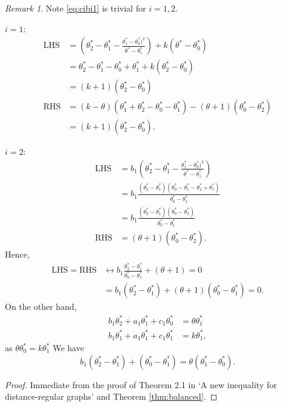 \documentclass[
]{book}
\theoremstyle{definition}
\theoremstyle{definition}
\theoremstyle{definition}
\theoremstyle{definition}
\theoremstyle{remark}
\newtheorem*{remark}{Remark}
\begin{document}
\begin{remark}
Note \eqref{eq:cibi1} is trivial for \(i = 1, 2\).

\(i=1\):
\begin{align}
\mathrm{LHS} & = \left(\theta^*_2-\theta^*_1 - \frac{\theta^*_1-\theta^*_0)^2}{\theta^*-\theta^*_1}\right)+ k(\theta^*-\theta^*_0)\\
& = \theta^*_2-\theta^*_1 - \theta^*_0 + \theta^*_1 + k(\theta_2^*-\theta^*_0)\\
& = (k+1)(\theta^*_2-\theta^*_0)\\
\mathrm{RHS} & = (k-\theta)(\theta^*_1+\theta^*_2-\theta^*_0-\theta^*_1)-(\theta+1)(\theta^*_0-\theta^*_2)\\
& = (k+1)(\theta^*_2-\theta^*_0).
\end{align}

\(i=2\):
\begin{align}
\mathrm{LHS} & = b_1\left(\theta^*_2-\theta^*_1 - \frac{\theta^*_1-\theta^*_0)^2}{\theta^*-\theta^*_1}\right)\\
& = b_1\frac{(\theta^*_2-\theta^*_1)(\theta^*_0-\theta^*_1-\theta^*_2+\theta^*_1)}{\theta^*_0-\theta^*_1}\\
& = b_1\frac{(\theta^*_2-\theta^*_1)(\theta^*_0-\theta^*_2)}{\theta^*_0-\theta^*_1}\\
\mathrm{RHS} & = (\theta+1)(\theta^*_0-\theta^*_2).
\end{align}
Hence,
\begin{align}
\mathrm{LHS}=\mathrm{RHS} & \leftrightarrow b_1\frac{\theta^*_2-\theta^*_1}{\theta^*_0-\theta^*_1} + (\theta + 1) = 0\\
& = b_1(\theta^*_2-\theta^*_1)+(\theta+1)(\theta^*_0-\theta^*_1) = 0.
\end{align}
On the other hand,
\begin{align}
b_1\theta^*_2 + a_1\theta^*_1 + c_1\theta^*_0 & = \theta \theta^*_1\\
b_1\theta^*_1 + a_1\theta^*_1 + c_1\theta^*_1 & = k \theta^*_1,
\end{align}
as \(\theta \theta^*_0 = k\theta^*_1\)
We have
\[b_1(\theta^*_2 - \theta^*_1) + (\theta^*_0-\theta^*_1) = \theta(\theta^*_1-\theta^*_0).\]
\end{remark}

\begin{proof}
Immediate from the proof of Theorem 2.1 in `A new inequality for distance-regular graphs' \citep{terwilliger:1995} and Theorem \ref{thm:balanced}.
\end{proof}
\end{document}
